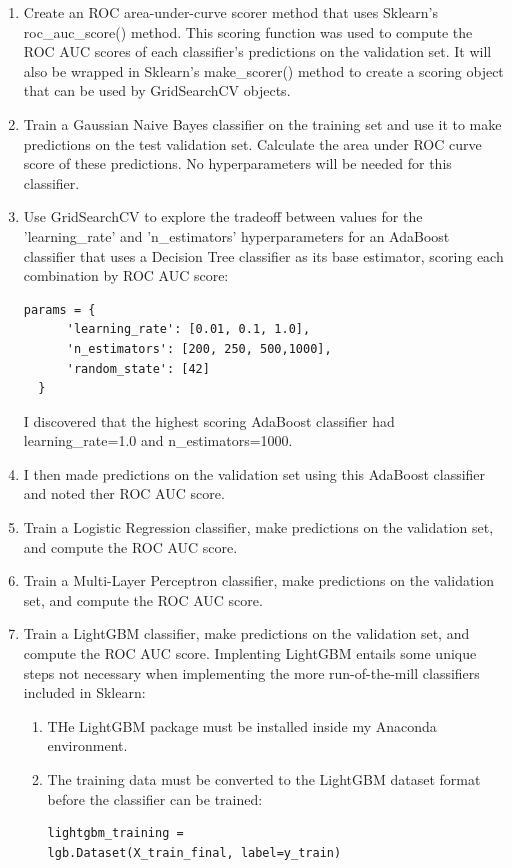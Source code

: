 \documentclass[12pt, letterpaper]{article}
\begin{document}
\begin{enumerate}
  \item Create an ROC area-under-curve scorer method that uses Sklearn's roc_auc_score() method. This scoring function was used to compute the ROC AUC scores of each classifier's predictions on the validation set. It will also be wrapped in Sklearn's make_scorer() method to create a scoring object that can be used by GridSearchCV objects.
  \item Train a Gaussian Naive Bayes classifier on the training set and use it to make predictions on the test validation set. Calculate the area under ROC curve score of these predictions. No hyperparameters will be needed for this classifier.
  \item Use GridSearchCV to explore the tradeoff between values for the 'learning_rate' and 'n_estimators' hyperparameters for an AdaBoost classifier that uses a Decision Tree classifier as its base estimator, scoring each combination by ROC AUC score:
  \begin{lstlisting}
params = {
      'learning_rate': [0.01, 0.1, 1.0],
      'n_estimators': [200, 250, 500,1000],
      'random_state': [42]
  }
  \end{lstlisting}
  I discovered that the highest scoring AdaBoost classifier had learning_rate=1.0 and n_estimators=1000.
  \item I then made predictions on the validation set using this AdaBoost classifier and noted ther ROC AUC score.
  \item Train a Logistic Regression classifier, make predictions on the validation set, and compute the ROC AUC score.
  \item Train a Multi-Layer Perceptron classifier, make predictions on the validation set, and compute the ROC AUC score.
  \item Train a LightGBM classifier, make predictions on the validation set, and compute the ROC AUC score. Implenting LightGBM entails some unique steps not necessary when implementing the more run-of-the-mill classifiers included in Sklearn:
    \begin{enumerate}
      \item THe LightGBM package must be installed inside my Anaconda environment.
      \item The training data must be converted to the LightGBM dataset format before the classifier can be trained:
      \begin{lstlisting}
lightgbm_training =
lgb.Dataset(X_train_final, label=y_train)
      \end{lstlisting}

\end{enumerate}
\end{enumerate}
\end{document}
